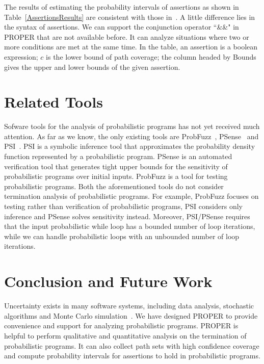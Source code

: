 \documentclass[runningheads]{llncs}
\begin{document}
The results of estimating the probability intervals of assertions as shown in Table~\ref{AssertionsResults} are consistent with those in~\cite{Sankaranarayanan2013Static}. A little difference lies in the syntax of assertions. We can support the conjunction operator  ``\&\&" in PROPER that are not available before. It can analyze situations where two or more conditions are met at the same time. In the table, an assertion is a boolean expression; $c$ is the lower bound of path coverage; the column headed by Bounds gives the upper and lower bounds of the given assertion.

\section{Related Tools}
Sofware tools for the analysis of probabilistic programs has not yet received much attention. 
As far as we know, the only existing tools are ProbFuzz~\cite{DBLP:conf/sigsoft/DuttaLHM18}, PSense~\cite{DBLP:conf/atva/HuangWM18} and PSI~\cite{DBLP:conf/cav/GehrMV16}.
PSI is a symbolic inference tool that approximates the probability density function represented by a probabilistic program. 
PSense is an automated verification tool that generates tight upper bounds for the sensitivity of probabilistic programs over initial inputs.
ProbFuzz is a tool for testing probabilistic programs. 
Both the aforementioned tools do not consider termination analysis of probabilistic programs. 
For example, ProbFuzz focuses on testing rather than verification of probabilistic programs, 
PSI considers only inference and PSense solves sensitivity instead. 
Moreover, PSI/PSense requires that the input probabilistic while loop has a bounded number of loop iterations, while we can handle probabilistic loops with an unbounded number of loop iterations.

\section{Conclusion and Future Work}
Uncertainty exists in many software systems, including data analysis, stochastic algorithms and Monte Carlo simulation~\cite{HASTINGS1970Monte}. We have designed PROPER  to provide convenience and support for analyzing probabilistic programs.
PROPER is helpful to perform qualitative and quantitative analysis on the termination of probabilistic programs. It can also collect path sets with high confidence coverage and compute  probability intervals for assertions to hold in probabilistic programs.
\end{document}
